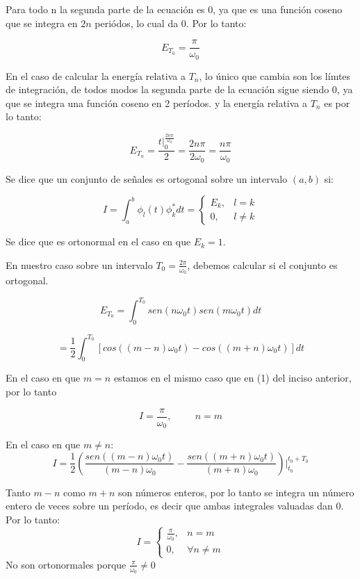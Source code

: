 \documentclass[12pt,a4paper]{report}
\begin{document}
\begin{enumerate}[label=\alph*),left=0pt]
\begin{itemize}[left=0pt]
    Para todo n la segunda parte de la ecuación es 0, ya que es una función coseno que se integra en $2n$ periódos, lo cual da 0. Por lo tanto:

    $$ E_{T_0}=\frac{\pi}{\omega_0} $$

    En el caso de calcular la energía relativa a $T_n$, lo único que cambia son los límtes 
    de integración, de todos modos la segunda parte de la ecuación sigue siendo 0, ya que se 
    integra una función coseno en 2 períodos. y la energía relativa a $T_n$ es por lo tanto:

    $$ E_{T_n}=\frac{t|^{\frac{2n\pi}{\omega_0}}_0}{2}=\frac{2n\pi}{2\omega_0}=\frac{n\pi}{\omega_0} $$

        Se dice que un conjunto de señales es ortogonal sobre un intervalo $(a,b)$ si:

    $$
    I=\int^b_a\phi_l(t)\phi^*_kdt=\begin{cases}
        E_k,& l=k\\
        0, & l\neq k
    \end{cases}
    $$

    Se dice que es ortonormal en el caso en que $E_k=1$.

    En nuestro caso sobre un intervalo $T_0=\frac{2\pi}{\omega_0}$, debemos calcular si el conjunto es ortogonal.

    $$ E_{T_0}=\int_0^{T_0}sen(n\omega_0t)sen(m\omega_0t)dt $$

    $$ =\frac{1}{2}\int_0^{T_0}[cos((m-n)\omega_0 t)-cos((m+n)\omega_0 t)]dt $$

    En el caso en que $m=n$ estamos en el mismo caso que en (1) del inciso anterior, por lo tanto 

    $$
    I=\frac{\pi}{\omega_0}, \hspace{1cm}n=m
    $$

    En el caso en que $m\neq n$:
    $$
    I=\frac{1}{2}(\frac{sen((m-n)\omega_0t)}{(m-n)\omega_0}-\frac{sen((m+n)\omega_0t)}{(m+n)\omega_0})|^{t_0+T_0}_{t_0}
    $$

    Tanto $m-n$ como $m+n$ son números enteros, por lo tanto se integra un número entero de veces sobre un período, es decir que ambas integrales valuadas dan 0. Por lo tanto:
    $$
    I=\begin{cases}
        \frac{\pi}{\omega_0},&n=m\\
        0,&\forall n\neq m
    \end{cases}
    $$
    No son ortonormales porque $\frac{\pi}{\omega_0}\neq 0$	



\end{itemize}
\end{enumerate}
\end{document}
